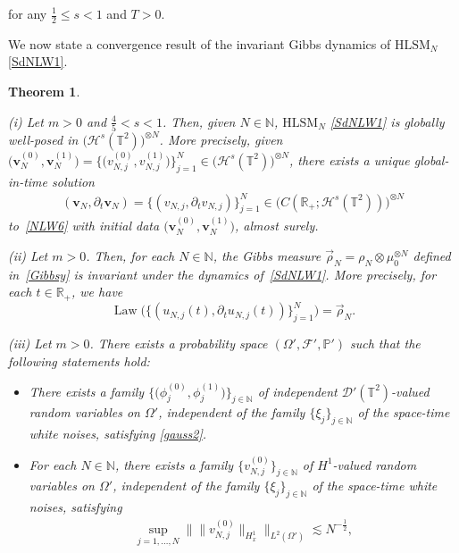 \documentclass[letterpaper, 11pt,  reqno]{amsart}
\newtheorem{theorem}{Theorem}[section]
\DeclareMathOperator{\Law}{Law}
\newcommand{\1}{\hspace{0.5mm}\text{I}\hspace{0.2mm}}
\newcommand{\noi}{\noindent}
\newcommand{\R}{\mathbb{R}}
\newcommand{\T}{\mathbb{T}}
\newcommand{\N}{\mathbb{N}}
\newcommand{\PP}{\mathbb{P}}
\newcommand{\D}{\mathcal{D}}
\renewcommand{\H}{\mathcal{H}}
\newcommand{\dt}{\partial_t}
\newcommand{\les}{\lesssim}
\newcommand{\rhoo}{\vec \rho_N}
\newcommand{\F}{\mathcal{F}}
\newcommand{\HLS}{$\text{HLSM}_N$ }
\newcommand{\vv}{\mathbf{v}}
\renewcommand{\O}{\Omega}
\numberwithin{equation}{section}
\numberwithin{theorem}{section}
\begin{document}
\noi
for any 
$\frac 12 \le s < 1$
and $T > 0$.



We  now  state a convergence  result 
of the invariant Gibbs dynamics
of \HLS \eqref{SdNLW1}.



\begin{theorem}
\label{THM:conv2}


\textup{(i)} 
Let $m > 0$ and $ \frac 45 < s < 1$.
Then, given $N \in \N$, \HLS \eqref{SdNLW1} is globally well-posed
in $\big(\H^s (\T^2)\big)^{\otimes N}$.
More precisely, 
given  $\big(\vv_{N}^{(0)},  \vv_{N}^{(1)}\big) = \big\{\big(v_{N, j}^{(0)},  v_{N, j}^{(1)}\big)\big\}_{j = 1}^N \in \big(\H^s (\T^2)\big)^{\otimes N}$, 
 there exists a unique global-in-time solution 
\begin{align*}
(\vv_N, \dt \vv_N) 
= \{(v_{N, j}, \dt v_{N, j})\}_{j = 1}^N
\in \big(  C (\R_+; \H^s (\T^2) )\big)^{\otimes N}
\end{align*}
 to~\eqref{NLW6} with initial data
$\big(\vv_{N}^{(0)},  \vv_{N}^{(1)}\big)$, 
almost surely.


\medskip

\noi
\textup{(ii)} 
Let $m > 0$. Then, for each $N \in \N$, the Gibbs measure $\rhoo = \rho_N \otimes \mu_0^{\otimes N}$ 
defined in~\eqref{Gibbsy} is invariant under the dynamics of~\eqref{SdNLW1}. More precisely, for each $t \in \R_+$, we have 
\[\Law 
 \Big( \{(u_{N, j}(t), \dt u_{N, j}(t))\}_{j = 1}^N \Big) = \rhoo.\]

\medskip

\noi
\textup{(iii)} 
Let $m > 0$.
There exists a probability space $(\O', \F', \PP')$
such that 
the following statements hold\textup{:}

\smallskip
\begin{itemize}
\item[(iii.a)]
There exists a family 
$\big\{ \big(\phi^{(0)}_j, \phi^{(1)}_j\big)\big\}_{j \in \N}$
of 
 independent $\D'(\T^2)$-valued random variables
 on $\O'$, 
independent of the family $\{\xi_j\}_{j \in \N}$
of the space-time white noises, 
satisfying \eqref{gauss2}.

\smallskip
\item [(iii.b)]
For each $N \in \N$, 
there exists  a family $\{v^{(0)}_{N, j}\}_{j \in \N}$
of $H^1$-valued 
random variables
 on $\O'$, 
independent of the family $\{\xi_j\}_{j \in \N}$
of the space-time white noises, satisfying
\begin{align}
\sup_{j =1, \dots, N}\Big\|  \big\|v^{(0)}_{N, j} \big\|_{H^1_x}\Big\|_{L^2(\O')}
 \les N^{-\frac 12 } , 
\label{randx}
\end{align}


\end{itemize}
\end{theorem}
\end{document}
